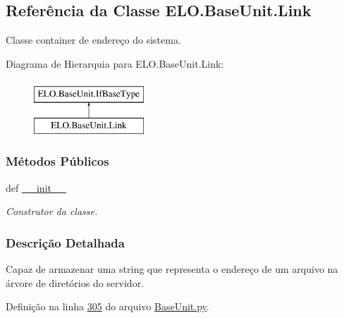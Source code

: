 \hypertarget{classELO_1_1BaseUnit_1_1Link}{\subsection{Referência da Classe E\-L\-O.\-Base\-Unit.\-Link}
\label{classELO_1_1BaseUnit_1_1Link}
}


Classe container de endereço do sistema.  


Diagrama de Hierarquia para E\-L\-O.\-Base\-Unit.\-Link\-:\begin{figure}[H]
\begin{center}
\leavevmode
\includegraphics[height=2.000000cm]{d9/dbc/classELO_1_1BaseUnit_1_1Link}
\end{center}
\end{figure}
\subsubsection*{Métodos Públicos}
\begin{DoxyCompactItemize}
\item 
def \hyperlink{classELO_1_1BaseUnit_1_1Link_a0c2308097022f21fc0ded45af15e9172}{\-\_\-\-\_\-init\-\_\-\-\_\-}
\begin{DoxyCompactList}\small\item\em Construtor da classe. \end{DoxyCompactList}\end{DoxyCompactItemize}


\subsubsection{Descrição Detalhada}
Capaz de armazenar uma string que representa o endereço de um arquivo na árvore de diretórios do servidor. 

Definição na linha \hyperlink{BaseUnit_8py_source_l00305}{305} do arquivo \hyperlink{BaseUnit_8py_source}{Base\-Unit.\-py}.



